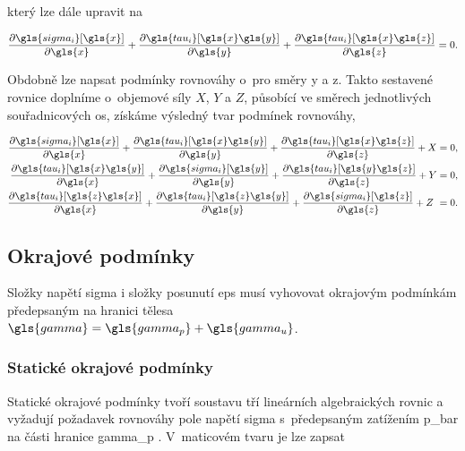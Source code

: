 který lze dále upravit na

\begin{equation}
    \pdv{\gls{sigma_i}[\gls{x}]}{\gls{x}}
    +
    \pdv{\gls{tau_i}[\gls{x}\gls{y}]}{\gls{y}}
    +
    \pdv{\gls{tau_i}[\gls{x}\gls{z}]}{\gls{z}}
    = 0.
\end{equation}

Obdobně lze napsat podmínky rovnováhy o~pro směry \gls{y} a \gls{z}. Takto sestavené rovnice doplníme o~objemové síly $X$, $Y$ a $Z$, působící ve směrech jednotlivých souřadnicových os, získáme výsledný tvar podmínek rovnováhy,

\begin{equation}
    \begin{aligned}
        \pdv{\gls{sigma_i}[\gls{x}]}{\gls{x}}
        +
        \pdv{\gls{tau_i}[\gls{x}\gls{y}]}{\gls{y}}
        +
        \pdv{\gls{tau_i}[\gls{x}\gls{z}]}{\gls{z}}
        + X & = 0, \\
        \pdv{\gls{tau_i}[\gls{x}\gls{y}]}{\gls{x}}
        +
        \pdv{\gls{sigma_i}[\gls{y}]}{\gls{y}}
        +
        \pdv{\gls{tau_i}[\gls{y}\gls{z}]}{\gls{z}}
        + Y & = 0, \\
        \pdv{\gls{tau_i}[\gls{z}\gls{x}]}{\gls{x}}
        +
        \pdv{\gls{tau_i}[\gls{z}\gls{y}]}{\gls{y}}
        +
        \pdv{\gls{sigma_i}[\gls{z}]}{\gls{z}}
        + Z~& = 0.
    \end{aligned}
\end{equation}

\subsection{Okrajové podmínky}

Složky napětí \gls{sigma} i složky posunutí \gls{eps} musí vyhovovat okrajovým podmínkám předepsaným na hranici tělesa $\gls{gamma} = \gls{gamma_p} + \gls{gamma_u}$.

\subsubsection*{Statické okrajové podmínky}
Statické okrajové podmínky tvoří soustavu tří lineárních algebraických rovnic a vyžadují požadavek rovnováhy pole napětí \gls{sigma} s~předepsaným zatížením \gls{p_bar} na části hranice \gls{gamma_p} \cite[35]{prpe10}. V~maticovém tvaru je lze zapsat

